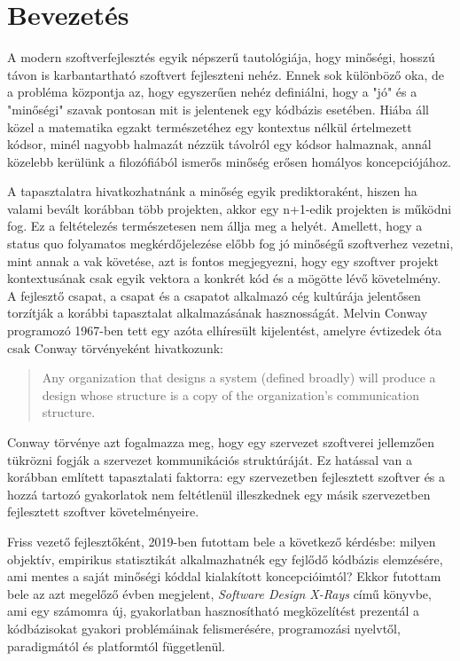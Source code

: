 \chapter{Bevezetés}
\label{ch:intro}

A modern szoftverfejlesztés egyik népszerű tautológiája, hogy minőségi, hosszú távon is karbantartható szoftvert fejleszteni nehéz. Ennek sok különböző oka, de a probléma központja az, hogy egyszerűen nehéz definiálni, hogy a "jó" és a "minőségi" szavak pontosan mit is jelentenek egy kódbázis esetében. Hiába áll közel a matematika egzakt természetéhez egy kontextus nélkül értelmezett kódsor, minél nagyobb halmazát nézzük távolról egy kódsor halmaznak, annál közelebb kerülünk a filozófiából ismerős minőség erősen homályos koncepciójához.

A tapasztalatra hivatkozhatnánk a minőség egyik prediktoraként, hiszen ha valami bevált korábban több projekten, akkor egy n+1-edik projekten is működni fog. Ez a feltételezés természetesen nem állja meg a helyét. Amellett, hogy a status quo folyamatos megkérdőjelezése előbb fog jó minőségű szoftverhez vezetni, mint annak a vak követése, azt is fontos megjegyezni, hogy egy szoftver projekt kontextusának csak egyik vektora a konkrét kód és a mögötte lévő követelmény. A fejlesztő csapat, a csapat és a csapatot alkalmazó cég kultúrája jelentősen torzítják a korábbi tapasztalat alkalmazásának hasznosságát. Melvin Conway programozó 1967-ben tett egy azóta elhíresült kijelentést, amelyre évtizedek óta csak Conway törvényeként\cite{conway} hivatkozunk:
\begin{quotation}
    Any organization that designs a system (defined broadly) will produce a design whose structure is a copy of the organization's communication structure.
\end{quotation}

Conway törvénye azt fogalmazza meg, hogy egy szervezet szoftverei jellemzően tükrözni fogják a szervezet kommunikációs struktúráját. Ez hatással van a korábban említett tapasztalati faktorra: egy szervezetben fejlesztett szoftver és a hozzá tartozó gyakorlatok nem feltétlenül illeszkednek egy másik szervezetben fejlesztett szoftver követelményeire.

Friss vezető fejlesztőként, 2019-ben futottam bele a következő kérdésbe: milyen objektív, empirikus statisztikát alkalmazhatnék egy fejlődő kódbázis elemzésére, ami mentes a saját minőségi kóddal kialakított koncepcióimtól? Ekkor futottam bele az azt megelőző évben megjelent, \textit{Software Design X-Rays}\cite{tornhillXrays} című könyvbe, ami egy számomra új, gyakorlatban hasznosítható megközelítést prezentál a kódbázisokat gyakori problémáinak felismerésére, programozási nyelvtől, paradigmától és platformtól függetlenül.

